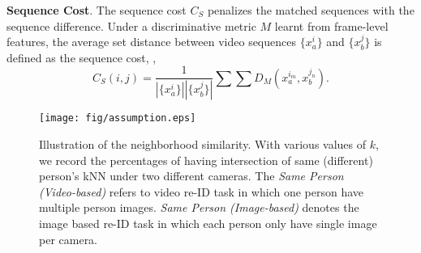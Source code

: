 \documentclass[10pt,twocolumn,letterpaper]{article}
\begin{document}
\textbf{Sequence Cost}. The sequence cost $C_{S}$ penalizes the matched sequences with the sequence difference. Under a discriminative metric $M$ learnt from frame-level features, the average set distance between video sequences $\{x_a^i\}$ and $\{x_b^j\}$ is defined as the sequence cost, \ie,
\begin{equation}\label{eq:Seqcost}
C_{S}(i,j) = \frac{1}{|\{x_a^i\}||\{x_b^j\}|}\sum_{} \sum_{}  D_M( x_a^{i_m},x_b^{j_n}).
\end{equation}
\begin{figure}[t]
  \centering
  \texttt{[image: fig/assumption.eps]}\\
  \caption{\small{Illustration of the neighborhood similarity. With various values of $k$, we record the percentages of having intersection of same (different) person's kNN under two different cameras. The \textit{Same Person (Video-based)} refers to video re-ID task in which one person have multiple person images. \textit{Same Person (Image-based)} denotes the image based re-ID task in which each person only have single image per camera.}}\label{fig:illustration}
\end{figure}
\end{document}
